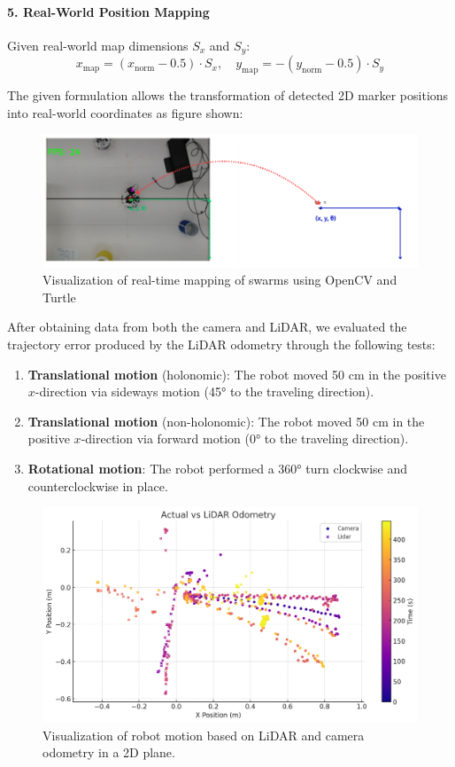 \paragraph*{5. Real-World Position Mapping}
Given real-world map dimensions $S_x$ and $S_y$:
\[
x_{\text{map}} = (x_{\text{norm}} - 0.5) \cdot S_x, \quad
y_{\text{map}} = -(y_{\text{norm}} - 0.5) \cdot S_y
\]

The given formulation allows the transformation of detected 2D marker positions into real-world coordinates as figure shown:

\begin{figure}[H]
    \centering
    \includegraphics[width=1\linewidth]{assets/images/odometry/mapping.png}
    \caption{Visualization of real-time mapping of swarms using OpenCV and Turtle}
    \label{fig:coor-mapping}
\end{figure}

\newpage
After obtaining data from both the camera and LiDAR, we evaluated the trajectory error produced by the LiDAR odometry through the following tests:

\begin{enumerate}
    \item \textbf{Translational motion} (holonomic): The robot moved 50 cm in the positive \(x\)-direction via sideways motion (45° to the traveling direction).
    \item \textbf{Translational motion} (non-holonomic): The robot moved 50 cm in the positive \(x\)-direction via forward motion (0° to the traveling direction).
    \item \textbf{Rotational motion}: The robot performed a 360° turn clockwise and counterclockwise in place.
\end{enumerate}


\begin{figure}[H]
    \centering
    \includegraphics[width=0.7\linewidth]{assets/images/odometry/testing_visual.png}
    \caption{Visualization of robot motion based on LiDAR and camera odometry in a 2D plane.}
    \label{fig:visual-result}
\end{figure}

